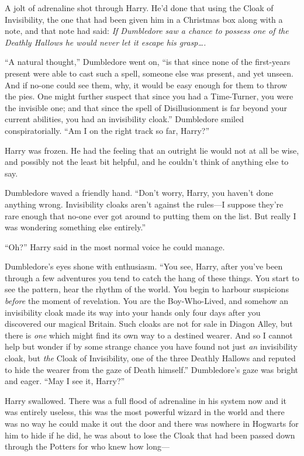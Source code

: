 A jolt of adrenaline shot through Harry. He’d done that using the Cloak of Invisibility, the one that had been given him in a Christmas box along with a note, and that note had said: \emph{If Dumbledore saw a chance to possess one of the Deathly Hallows he would never let it escape his grasp….}

“A natural thought,” Dumbledore went on, “is that since none of the first-years present were able to cast such a spell, someone else was present, and yet unseen. And if no-one could see them, why, it would be easy enough for them to throw the pies. One might further suspect that since you had a Time-Turner, you were the invisible one; and that since the spell of Disillusionment is far beyond your current abilities, you had an invisibility cloak.” Dumbledore smiled conspiratorially. “Am I on the right track so far, Harry?”

Harry was frozen. He had the feeling that an outright lie would not at all be wise, and possibly not the least bit helpful, and he couldn’t think of anything else to say.

Dumbledore waved a friendly hand. “Don’t worry, Harry, you haven’t done anything wrong. Invisibility cloaks aren’t against the rules—I suppose they’re rare enough that no-one ever got around to putting them on the list. But really I was wondering something else entirely.”

“Oh?” Harry said in the most normal voice he could manage.

Dumbledore’s eyes shone with enthusiasm. “You see, Harry, after you’ve been through a few adventures you tend to catch the hang of these things. You start to see the pattern, hear the rhythm of the world. You begin to harbour suspicions \emph{before} the moment of revelation. You are the Boy-Who-Lived, and somehow an invisibility cloak made its way into your hands only four days after you discovered our magical Britain. Such cloaks are not for sale in Diagon Alley, but there is \emph{one} which might find its own way to a destined wearer. And so I cannot help but wonder if by some strange chance you have found not just \emph{an} invisibility cloak, but \emph{the} Cloak of Invisibility, one of the three Deathly Hallows and reputed to hide the wearer from the gaze of Death himself.” Dumbledore’s gaze was bright and eager. “May I see it, Harry?”

Harry swallowed. There was a full flood of adrenaline in his system now and it was entirely useless, this was the most powerful wizard in the world and there was no way he could make it out the door and there was nowhere in Hogwarts for him to hide if he did, he was about to lose the Cloak that had been passed down through the Potters for who knew how long—

